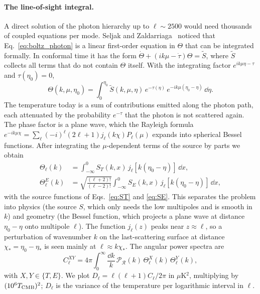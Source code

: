 \paragraph*{The line-of-sight integral.} A direct solution of the photon hierarchy up to $\ell\sim2500$ would need
thousands of coupled equations per mode. Seljak and Zaldarriaga~\cite{Seljak1996} noticed that Eq.~\eqref{eq:boltz_photon}
is a linear first-order equation in $\Theta$ that can be integrated formally. In conformal time it has the form
$\dot\Theta+(ik\mu-\dot\tau)\Theta=\tilde S$, where $\tilde S$ collects all terms that do not contain $\Theta$
itself. With the integrating factor $e^{ik\mu\eta-\tau}$ and $\tau(\eta_0)=0$,
\begin{equation}
\Theta(k,\mu,\eta_0)=\int_0^{\eta_0}\tilde S(k,\mu,\eta)\,e^{-\tau(\eta)}\,e^{-ik\mu(\eta_0-\eta)}\,\dd\eta .
\end{equation}
The temperature today is a sum of contributions emitted along the photon path, each attenuated by the probability
$e^{-\tau}$ that the photon is not scattered again. The phase factor is a plane wave, which the Rayleigh formula
$e^{-ik\mu\chi}=\sum_\ell(-i)^\ell(2\ell+1)j_\ell(k\chi)P_\ell(\mu)$ expands into spherical Bessel functions. After
integrating the $\mu$-dependent terms of the source by parts we obtain
\begin{align}
\Theta_\ell(k) &= \int_{-\infty}^{0} S_T(k,x)\,j_\ell[k(\eta_0-\eta)]\,\dd x, \label{eq:los}\\
\Theta^E_\ell(k) &= \sqrt{\frac{(\ell+2)!}{(\ell-2)!}}\int_{-\infty}^{0} S_E(k,x)\,j_\ell[k(\eta_0-\eta)]\,\dd x,
\end{align}
with the source functions of Eqs.~\eqref{eq:ST} and \eqref{eq:SE}. This separates the problem into physics
(the source $S$, which only needs the low multipoles and is smooth in $k$) and geometry (the Bessel function, which
projects a plane wave at distance $\eta_0-\eta$ onto multipole $\ell$). The function $j_\ell(z)$ peaks near $z\approx\ell$,
so a perturbation of wavenumber $k$ on the last-scattering surface at distance $\chi_*=\eta_0-\eta_*$ is seen mainly at
$\ell\approx k\chi_*$. The angular power spectra are
\begin{equation}
C_\ell^{XY} = 4\pi\int_0^\infty\frac{\dd k}{k}\,\mathcal{P}_{\mathcal{R}}(k)\,\Theta^X_\ell(k)\,\Theta^Y_\ell(k),
\label{eq:cl}
\end{equation}
with $X,Y\in\{T,E\}$. We plot $D_\ell=\ell(\ell+1)C_\ell/2\pi$ in $\mu$K$^2$, multiplying by $(10^6T_{\rm CMB})^2$;
$D_\ell$ is the variance of the temperature per logarithmic interval in $\ell$.

